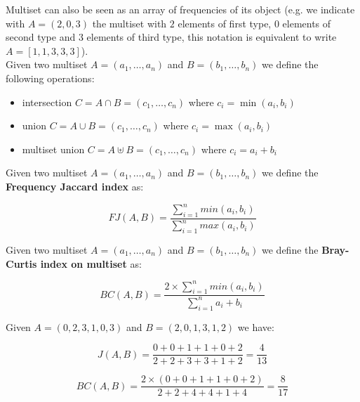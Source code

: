 Multiset can also be seen as an array of frequencies of its object (e.g. we indicate with $A = (2, 0, 3)$ the multiset with $2$ elements of first type, $0$ elements of second type and $3$ elements of third type, this notation is equivalent to write $A = [1, 1, 3, 3, 3]$).\\

 Given two multiset $A = (a_{1}, \ldots, a_{n}) $ and $B = (b_{1}, \ldots, b_{n})$ we define the following operations:

\begin{itemize}
  \item intersection $C = A \cap B  = (c_{1}, \ldots, c_{n})$ where $c_{i} = \min(a_{i}, b_{i})$
  \item union $C = A \cup B  = (c_{1}, \ldots, c_{n})$ where $c_{i} = \max(a_{i}, b_{i})$
  \item multiset union $C = A \uplus B  = (c_{1}, \ldots, c_{n})$ where $c_{i} = a_{i} + b_{i}$
\end{itemize}


\begin{definizione}\label{def:wjaccard}
    Given two multiset $A = (a_{1}, \ldots, a_{n}) $ and $B = (b_{1}, \ldots, b_{n})$ we define the \textbf{Frequency Jaccard index} as:
    
    \begin{equation}
    FJ(A,B) = \frac{\sum\limits_{i=1}^n { min(a_{i}, b_{i}) } }{\sum\limits_{i=1}^n { max(a_{i}, b_{i}) }}
    \end{equation}
    
\end{definizione}

\begin{definizione}\label{def:wbray}
    Given two multiset $A = (a_{1}, \ldots, a_{n}) $ and $B = (b_{1}, \ldots, b_{n})$ we define the \textbf{Bray-Curtis index on multiset} as:
    
    \begin{equation}
    BC(A,B) = \frac{ 2 \times \sum\limits_{i=1}^n { min(a_{i}, b_{i}) } }{\sum\limits_{i=1}^n {a_{i} + b_{i}}}
    \end{equation}
    
\end{definizione}

\begin{esempio}
	Given $A = (0, 2, 3, 1, 0, 3) $ and $B = (2, 0, 1, 3, 1, 2)$ we have:
	
	\begin{equation}
	J(A,B) = \frac{0 + 0 + 1 + 1 + 0 + 2}{2 + 2 + 3 + 3 + 1 + 2} = \frac{4}{13} 
	\end{equation}
	
	\begin{equation}
	BC(A,B) = \frac{2 \times (0 + 0 + 1 + 1 + 0 + 2) }{2 + 2 + 4 + 4 + 1 + 4} = \frac{8}{17}
	\end{equation}
\end{esempio}


